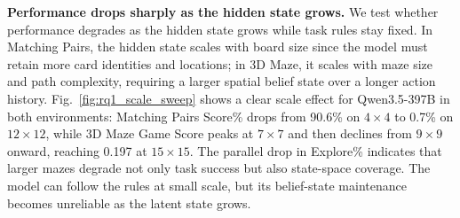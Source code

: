 \documentclass{llmxive}
\begin{document}
\noindent\textbf{Performance drops sharply as the hidden state grows.} We test whether performance degrades as the hidden state grows while task rules stay fixed. In Matching Pairs, the hidden state scales with board size since the model must retain more card identities and locations; in 3D Maze, it scales with maze size and path complexity, requiring a larger spatial belief state over a longer action history. Fig.~\ref{fig:rq1_scale_sweep} shows a clear scale effect for Qwen3.5-397B in both environments: Matching Pairs Score\% drops from 90.6\% on $4{\times}4$ to 0.7\% on $12{\times}12$, while 3D Maze Game Score peaks at $7{\times}7$ and then declines from $9{\times}9$ onward, reaching 0.197 at $15{\times}15$. The parallel drop in Explore\% indicates that larger mazes degrade not only task success but also state-space coverage. The model can follow the rules at small scale, but its belief-state maintenance becomes unreliable as the latent state grows.
\end{document}
